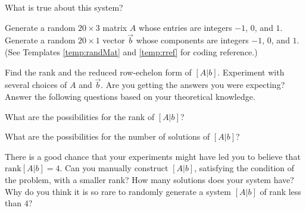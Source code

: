 \documentclass{ximera}
\begin{document}
\begin{problem}
\begin{enumerate}
    What is true about this system?
    \begin{multipleChoice}
    \end{multipleChoice}

         \end{enumerate}
\end{problem}

\begin{problem}\label{prob_oct_2}
Generate a random $20\times 3$ matrix $A$ whose entries are integers $-1$, $0$, and $1$.  Generate a random $20\times 1$ vector $\vec{b}$ whose components are integers $-1$, $0$, and $1$.  (See Templates \ref{temp:randMat} and \ref{temp:rref} for coding reference.)

Find the rank and the reduced row-echelon form of $[A | b]$.  Experiment with several choices of $A$ and $\vec{b}$.  Are you getting the answers you were expecting?  Answer the following questions based on your theoretical knowledge.

What are the possibilities for the rank of $[A | b]$?  

\begin{multipleChoice}
\end{multipleChoice}

What are the possibilities for the number of solutions of $[A | b]$?

\begin{multipleChoice}
\end{multipleChoice}

There is a good chance that your experiments might have led you to believe that $\text{rank}[A | b]=4$.  Can you manually construct $[A | b]$, satisfying the condition of the problem, with a smaller rank?  How many solutions does your system have?  Why do you think it is so rare to randomly generate a system $[A | b]$ of rank less than $4$?


\end{problem}
\end{document}
